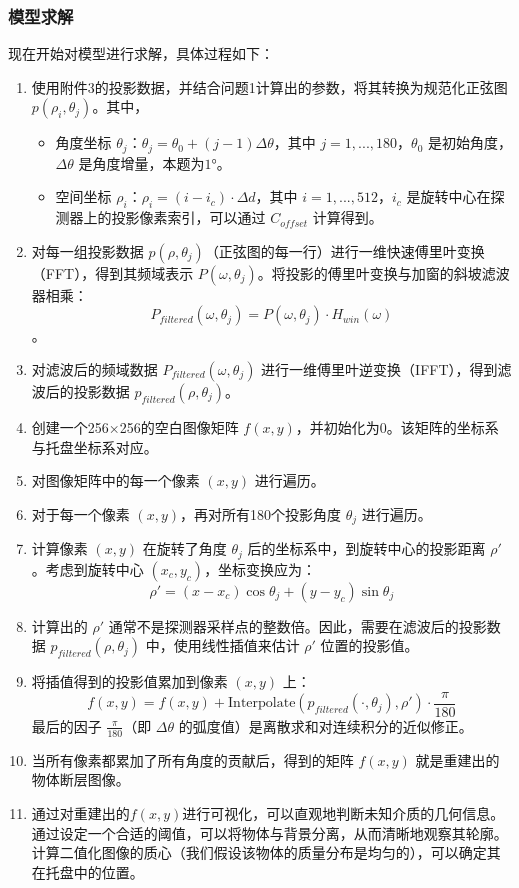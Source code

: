 \subsubsection{模型求解}
现在开始对模型进行求解，具体过程如下：
\begin{enumerate}
    \item 使用附件3的投影数据，并结合问题1计算出的参数，将其转换为规范化正弦图 $p(\rho_i,\theta_j)$。其中，
    \begin{itemize}
        \item 角度坐标 $\theta_j$：$\theta_j=\theta_0+(j-1)\Delta\theta$，其中 $j=1,...,180$，$\theta_0$ 是初始角度，$\Delta\theta$ 是角度增量，本题为$1°$。
        \item 空间坐标 $\rho_i$：$\rho_i=(i-i_c)\cdot\Delta d$，其中 $i=1,...,512$，$i_c$ 是旋转中心在探测器上的投影像素索引，可以通过 $C_{offset}$ 计算得到。
    \end{itemize}
    \item 对每一组投影数据 $p(\rho,\theta_j)$（正弦图的每一行）进行一维快速傅里叶变换（FFT），得到其频域表示 $P(\omega,\theta_j)$。将投影的傅里叶变换与加窗的斜坡滤波器相乘：
    $$P_{filtered}(\omega,\theta_j)=P(\omega,\theta_j)\cdot H_{win}(\omega)$$。
    \item 对滤波后的频域数据 $P_{filtered}(\omega,\theta_j)$ 进行一维傅里叶逆变换（IFFT），得到滤波后的投影数据 $p_{filtered}(\rho,\theta_j)$。
    \item 创建一个256×256的空白图像矩阵 $f(x,y)$，并初始化为0。该矩阵的坐标系与托盘坐标系对应。
    \item 对图像矩阵中的每一个像素 $(x,y)$ 进行遍历。
    \item 对于每一个像素 $(x,y)$，再对所有180个投影角度 $\theta_j$ 进行遍历。
    \item 计算像素 $(x,y)$ 在旋转了角度 $\theta_j$ 后的坐标系中，到旋转中心的投影距离 $\rho'$。考虑到旋转中心 $(x_c,y_c)$，坐标变换应为：
       $$\rho'=(x-x_c)\cos\theta_j+(y-y_c)\sin\theta_j$$
    \item 计算出的 $\rho'$ 通常不是探测器采样点的整数倍。因此，需要在滤波后的投影数据 $p_{filtered}(\rho,\theta_j)$ 中，使用线性插值来估计 $\rho'$ 位置的投影值。
    \item 将插值得到的投影值累加到像素 $(x,y)$ 上：
       $$f(x,y)=f(x,y)+\text{Interpolate}(p_{filtered}(\cdot,\theta_j),\rho')\cdot\frac{\pi}{180}$$
       最后的因子 $\frac{\pi}{180}$（即 $\Delta\theta$ 的弧度值）是离散求和对连续积分的近似修正。
    \item 当所有像素都累加了所有角度的贡献后，得到的矩阵 $f(x,y)$ 就是重建出的物体断层图像。
    \item 通过对重建出的$f(x,y)$进行可视化，可以直观地判断未知介质的几何信息。通过设定一个合适的阈值，可以将物体与背景分离，从而清晰地观察其轮廓。计算二值化图像的质心（我们假设该物体的质量分布是均匀的），可以确定其在托盘中的位置。
\end{enumerate}


